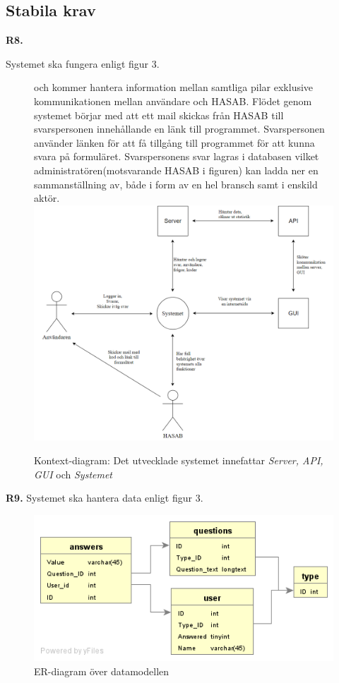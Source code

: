 \documentclass{article}
\begin{document}
    \subsection{Stabila krav}
    \noindent \large{\textbf{R8.}}
    \normalsize{Systemet ska fungera enligt figur 3.
    
    \begin{figure}[h!]
    \caption{Kontext-diagram: Det utvecklade systemet innefattar \textit{Server, API, GUI} och \textit{Systemet}} och kommer hantera information mellan samtliga pilar exklusive kommunikationen mellan användare och HASAB. Flödet genom systemet börjar med att ett mail skickas från HASAB till svarspersonen innehållande en länk till programmet. Svarspersonen använder länken för att få tillgång till programmet för att kunna svara på formuläret. Svarspersonens svar lagras i databasen vilket administratören(motsvarande HASAB i figuren) kan ladda ner en sammanställning av, både i form av en hel bransch samt i enskild aktör.\\
    
    \includegraphics[width=150mm]{Kontextdiagram.png}
    
    \end{figure}
}
    \newpage
    \noindent \large{\textbf{R9.}}
    Systemet ska hantera data enligt figur 3.
       \begin{figure}[h!]
    
    \includegraphics[width=150mm]{er.png}
    \caption{ER-diagram över datamodellen}
    \end{figure}
    
\end{document}
